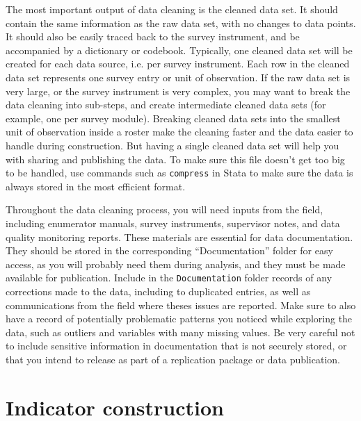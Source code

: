 
The most important output of data cleaning is the cleaned data set. 
It should contain the same information as the raw data set,
with no changes to data points.
It should also be easily traced back to the survey instrument,
and be accompanied by a dictionary or codebook.
Typically, one cleaned data set will be created for each data source,
i.e. per survey instrument.
Each row in the cleaned data set represents one survey entry or unit of observation.
If the raw data set is very large, or the survey instrument is very complex,
you may want to break the data cleaning into sub-steps, 
and create intermediate cleaned data sets
(for example, one per survey module).
Breaking cleaned data sets into the smallest unit of observation inside a roster
make the cleaning faster and the data easier to handle during construction.
But having a single cleaned data set will help you with sharing and publishing the data.
To make sure this file doesn't get too big to be handled,
use commands such as \texttt{compress} in Stata to make sure the data
is always stored in the most efficient format.

Throughout the data cleaning process, you will need inputs from the field, 
including enumerator manuals, survey instruments, 
supervisor notes, and data quality monitoring reports.
These materials are essential for data documentation.
They should be stored in the corresponding ``Documentation'' folder for easy access, 
as you will probably need them during analysis,
and they must be made available for publication.
Include in the \texttt{Documentation} folder records of any
corrections made to the data, including to duplicated entries,
as well as communications from the field where theses issues are reported.
Make sure to also have a record of potentially problematic patterns you noticed
while exploring the data, such as outliers and variables with many missing values.
Be very careful not to include sensitive information in 
documentation that is not securely stored, 
or that you intend to release as part of a replication package or data publication.

\section{Indicator construction}

